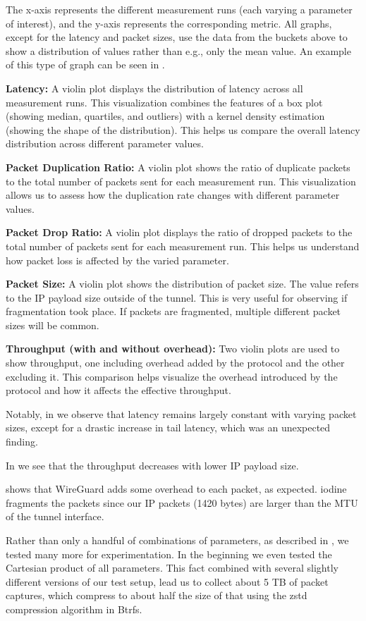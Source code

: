 The x-axis represents the different measurement runs (each varying a parameter of interest), and the y-axis represents the corresponding metric.
All graphs, except for the latency and packet sizes, use the data from the buckets above to show a distribution of values rather than e.g., only the mean value.
An example of this type of graph can be seen in .

\noindent\textbf{Latency:} A violin plot displays the distribution of latency across all measurement runs.
This visualization combines the features of a box plot (showing median, quartiles, and outliers) with a kernel density estimation (showing the shape of the distribution).
This helps us compare the overall latency distribution across different parameter values.

\noindent\textbf{Packet Duplication Ratio:} A violin plot shows the ratio of duplicate packets to the total number of packets sent for each measurement run.
This visualization allows us to assess how the duplication rate changes with different parameter values.

\noindent\textbf{Packet Drop Ratio:} A violin plot displays the ratio of dropped packets to the total number of packets sent for each measurement run.
This helps us understand how packet loss is affected by the varied parameter.

\noindent\textbf{Packet Size:} A violin plot shows the distribution of packet size.
The value refers to the IP payload size outside of the tunnel.
This is very useful for observing if fragmentation took place.
If packets are fragmented, multiple different packet sizes will be common.

\noindent\textbf{Throughput (with and without overhead):} Two violin plots are used to show throughput, one including overhead added by the protocol and the other excluding it.
This comparison helps visualize the overhead introduced by the protocol and how it affects the effective throughput.


Notably, in  we observe that latency remains largely constant with varying packet sizes, except for a drastic increase in tail latency, which was an unexpected finding.

In  we see that the throughput decreases with lower IP payload size.

 shows that WireGuard adds some overhead to each packet, as expected.
iodine fragments the packets since our IP packets (1420 bytes) are larger than the MTU of the tunnel interface.





Rather than only a handful of combinations of parameters, as described in , we tested many more for experimentation.
In the beginning we even tested the Cartesian product of all parameters.
This fact combined with several slightly different versions of our test setup, lead us to collect about 5 TB of packet captures, which compress to about half the size of that using the zstd compression algorithm in Btrfs.


